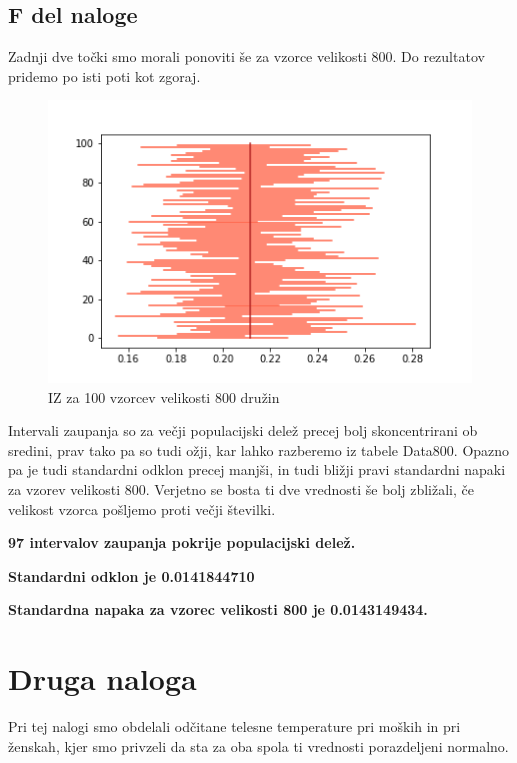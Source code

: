 \documentclass{article}
\begin{document}
    \subsection{F del naloge}
    Zadnji dve točki smo morali ponoviti še za vzorce velikosti 800. Do rezultatov pridemo po isti poti kot zgoraj.
    \begin{figure}[H]
        \begin{center}
            \includegraphics[scale=0.5]{../PythonKoda/IZ800.png}
            \caption{IZ za 100 vzorcev velikosti 800 družin}
            \label{800}
        \end{center} 
    \end{figure}
    Intervali zaupanja so za večji populacijski delež precej bolj skoncentrirani ob sredini, prav tako pa so tudi ožji, kar lahko razberemo iz tabele Data800. Opazno pa je
    tudi standardni odklon precej manjši, in tudi bližji pravi standardni napaki za vzorev velikosti 800. Verjetno se bosta ti dve vrednosti še bolj zbližali, če velikost vzorca
    pošljemo proti večji številki.
    \par \textbf{97 intervalov zaupanja pokrije populacijski delež.}
    \par \textbf{Standardni odklon je 0.0141844710}
    \par \textbf{Standardna napaka za vzorec velikosti 800 je 0.0143149434.}


    \section{Druga naloga}
    Pri tej nalogi smo obdelali odčitane telesne temperature pri moških in pri ženskah, kjer smo privzeli da sta za oba spola ti vrednosti porazdeljeni normalno.
\end{document}
